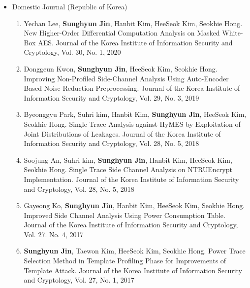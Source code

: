 \documentclass[a4paper,20pt]{article}
\begin{document}
\begin{itemize}
    \item {Domestic Journal (Republic of Korea)}
        \vspace{-6pt}
        \begin{enumerate}
            \item {Yechan Lee, \textbf{Sunghyun Jin}, Hanbit Kim, HeeSeok Kim, Seokhie Hong. New Higher-Order Differential Computation Analysis on Masked White-Box AES. Journal of the Korea Institute of Information Security and Cryptology, Vol. 30, No. 1, 2020}
            \vspace{-2pt}
            \item {Donggeun Kwon, \textbf{Sunghyun Jin}, HeeSeok Kim, Seokhie Hong. Improving Non-Profiled Side-Channel Analysis Using Auto-Encoder Based Noise Reduction Preprocessing. Journal of the Korea Institute of Information Security and Cryptology, Vol. 29, No. 3, 2019}
            \vspace{-2pt}
            \item {Byeonggyu Park, Suhri kim, Hanbit Kim, \textbf{Sunghyun Jin}, HeeSeok Kim, Seokhie Hong. Single Trace Analysis against HyMES by Exploitation of Joint Distributions of Leakages. Journal of the Korea Institute of Information Security and Cryptology, Vol. 28, No. 5, 2018}
            \vspace{-2pt}
            \item {Soojung An, Suhri kim, \textbf{Sunghyun Jin}, Hanbit Kim, HeeSeok Kim, Seokhie Hong. Single Trace Side Channel Analysis on NTRUEncrypt Implementation. Journal of the Korea Institute of Information Security and Cryptology, Vol. 28, No. 5, 2018}
            \vspace{-2pt}
            \item {Gayeong Ko, \textbf{Sunghyun Jin}, Hanbit Kim, HeeSeok Kim, Seokhie Hong. Improved Side Channel Analysis Using Power Consumption Table. Journal of the Korea Institute of Information Security and Cryptology, Vol. 27. No. 4, 2017}
            \vspace{-2pt}
            \item {\textbf{Sunghyun Jin}, Taewon Kim, HeeSeok Kim, Seokhie Hong. Power Trace Selection Method in Template Profiling Phase for Improvements of Template Attack. Journal of the Korea Institute of Information Security and Cryptology, Vol. 27, No. 1, 2017}
            \vspace{-2pt}
        \end{enumerate}
        

\end{itemize}
\end{document}
